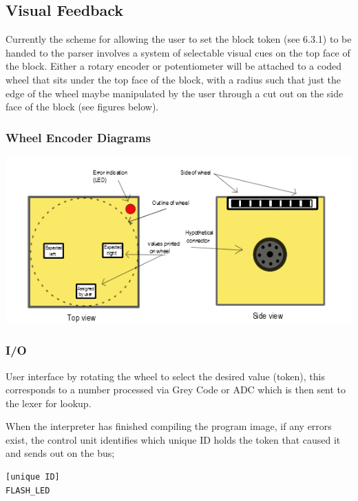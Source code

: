 \subsection{ Visual Feedback}
Currently the scheme for allowing the user to set the  block token (see 6.3.1) to be handed to the parser involves a system of selectable visual cues on the top face of the block. Either a rotary encoder or potentiometer will be attached to a coded wheel that sits under the top face of the block, with a radius such that just the edge of the wheel maybe manipulated by the user through a cut out on the side face of the block (see figures below).
\subsubsection{Wheel Encoder Diagrams}
\includegraphics{BlkFace.png}
\subsubsection{I/O}
User interface by rotating the wheel to select the desired value (token), this corresponds to a number processed via Grey Code or ADC which is then sent to the lexer for lookup.

When the interpreter has finished compiling the program image, if any errors exist, the control unit identifies which unique ID holds the token that caused it and sends out on the bus;
\begin{verbatim}
[unique ID]
FLASH_LED
\end{verbatim}



